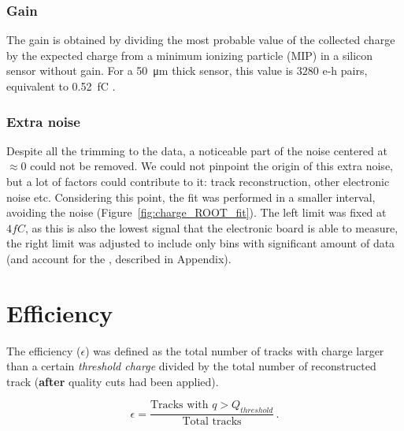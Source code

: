 \subsubsection{Gain}
The gain is obtained by dividing the most probable value of the collected charge by the expected charge from a minimum ionizing particle (MIP) in a silicon sensor without gain. For a \qty{50}{\micro\meter} thick sensor, this value is \(3280\) e-h pairs, equivalent to \qty{.52}{\femto\coulomb} \cite{meroli_energy_loss2011}.

\subsubsection{Extra noise}
Despite all the trimming to the data, a noticeable part of the noise centered at \(\approx 0\) could not be removed. We could not pinpoint the origin of this extra noise, but a lot of factors could contribute to it: track reconstruction, other electronic noise etc.
Considering this point, the fit was performed in a smaller interval, avoiding the noise (Figure~\ref{fig:charge_ROOT_fit}). The left limit was fixed at \(4\si{fC}\), as this is also the lowest signal that the electronic board is able to measure, the right limit was adjusted to include only bins with significant amount of data (and account for the , described in Appendix).



\section{Efficiency}\label{sec:methods_efficiency}

The efficiency (\(\epsilon\)) was defined as the total number of tracks with charge larger than a certain \textit{threshold charge} divided by the total number of reconstructed track (\textbf{after} quality cuts had been applied).


\begin{equation*}
    \epsilon = \frac{\text{Tracks with } q>Q_{threshold}}{\text{Total tracks}}  \, .
\end{equation*}

